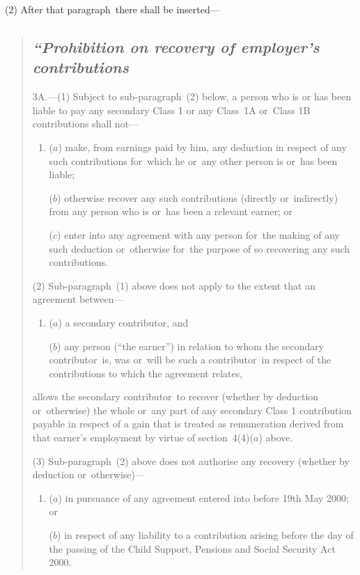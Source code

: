 \documentclass[12pt,a4paper]{article}
\begin{document}
(2) After that paragraph~there shall be inserted—
\begin{quotation}
\subsection*{\itshape\sloppy “Prohibition on recovery of employer’s contributions}

3A.---(1) Subject to sub-paragraph~(2)  below, a person who is or has been liable to pay any secondary Class 1 or any Class~1A or~Class 1B contributions shall not—
\begin{enumerate}\item[]
($a$) make, from earnings paid by him, any deduction in respect of any such contributions for~which he or~any other person is or~has been liable;

($b$) otherwise recover any such contributions (directly or~indirectly) from any person who is or~has been a relevant earner; or

($c$) enter into any agreement with any person for~the making of any such deduction or~otherwise for~the purpose of so recovering any such contributions.
\end{enumerate}

(2) Sub-paragraph~(1)  above does not apply to the extent that an agreement between—
\begin{enumerate}\item[]
($a$) a secondary contributor, and

($b$) any person (“the earner”) in relation to whom the secondary contributor~is, was or~will be such a contributor~in respect of the contributions to which the agreement relates,
\end{enumerate}
allows the secondary contributor~to recover (whether by deduction or~otherwise) the whole or~any part of any secondary Class 1 contribution payable in respect of a gain that is treated as remuneration derived from that earner’s employment by virtue of section~4(4)($a$)  above.

(3) Sub-paragraph~(2)  above does not authorise any recovery (whether by deduction or~otherwise)—
\begin{enumerate}\item[]
($a$) in pursuance of any agreement entered into before 19th May 2000; or

($b$) in respect of any liability to a contribution arising before the day of the passing of the Child Support, Pensions and Social Security Act 2000. 
\end{enumerate}


\end{quotation}
\end{document}
